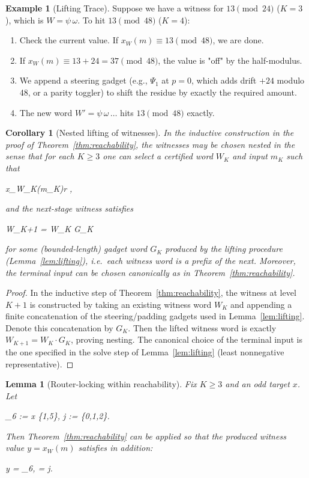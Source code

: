 \documentclass[11pt,letterpaper]{amsart}
\def\[{ }%
\def\]{ }%
\theoremstyle{definition}
\newtheorem{example}{Example}
\theoremstyle{plain}
\newtheorem{lemma}{Lemma}
\theoremstyle{plain}
\newtheorem{corollary}[theorem]{Corollary}
\theoremstyle{remark}
\begin{document}
\begin{example}[Lifting Trace]
Suppose we have a witness for $13 \pmod{24}$ ($K=3$), which is $W=\psi\,\omega$.
To hit $13 \pmod{48}$ ($K=4$):
\begin{enumerate}
    \item Check the current value. If $x_W(m) \equiv 13 \pmod{48}$, we are done.
    \item If $x_W(m) \equiv 13+24 = 37 \pmod{48}$, the value is "off" by the half-modulus.
    \item We append a steering gadget (e.g., $\Psi_1$ at $p=0$, which adds drift $+24$ modulo 48, or a parity toggler) to shift the residue by exactly the required amount.
    \item The new word $W' = \psi\,\omega\,\dots$ hits $13 \pmod{48}$ exactly.
\end{enumerate}
\end{example}

\begin{corollary}[Nested lifting of witnesses]
\label{cor:nested-lifting}
In the inductive construction in the proof of Theorem~\ref{thm:reachability}, the witnesses
may be chosen \emph{nested} in the sense that for each $K\ge 3$ one can select a certified
word $W_K$ and input $m_K$ such that
\[
x_{W_K}(m_K)\equiv r ,
\]
and the next-stage witness satisfies
\[
W_{K+1} \;=\; W_K \cdot G_K
\]
for some (bounded-length) gadget word $G_K$ produced by the lifting procedure
(Lemma~\ref{lem:lifting}), i.e.\ each witness word is a prefix of the next.
Moreover, the terminal input can be chosen canonically as in Theorem~\ref{thm:reachability}.
\end{corollary}

\begin{proof}
In the inductive step of Theorem~\ref{thm:reachability}, the witness at level $K{+}1$ is
constructed by taking an existing witness word $W_K$ and appending a finite concatenation
of the steering/padding gadgets used in Lemma~\ref{lem:lifting}. Denote this concatenation
by $G_K$. Then the lifted witness word is exactly $W_{K+1}=W_K\cdot G_K$, proving nesting.
The canonical choice of the terminal input is the one specified in the solve step of
Lemma~\ref{lem:lifting} (least nonnegative representative).
\end{proof}

\begin{lemma}[Router-locking within reachability]
\label{lem:router-locking}
Fix $K\ge 3$ and an odd target $x$. Let
\[
\delta_{6} := x \in\{1,5\},\qquad
j := \left\lfloor {}\right\rfloor {} \in\{0,1,2\}.
\]
Then Theorem~\ref{thm:reachability} can be applied so that the produced witness value
$y=x_W(m)$ satisfies \emph{in addition}:
\[
y  = \delta_{6},
\qquad
\left\lfloor {}\right\rfloor {} = j.
\]
\end{lemma}
\end{document}

